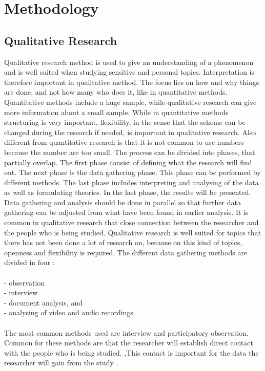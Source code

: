 \chapter{Methodology}
\section{Qualitative Research}
Qualitative research method is used to give an understanding of a phenomenon and is well suited when studying sensitive and personal topics. Interpretation is therefore important in qualitative method.  The focus lies on how and why things are done, and not how many who does it, like in quantitative methods. Quantitative methods include a huge sample, while qualitative research can give more information about a small sample. While in quantitative methods structuring is very important, flexibility, in the sense that the scheme can be changed during the research if needed, is important in qualitative research. Also different from quantitative research is that it is not common to use numbers because the number are too small. The process can be divided into phases, that partially overlap. The first phase consist of defining what the research will find out. The next phase is the data gathering phase. This phase can be performed by different methods. The last phase includes interpreting and analysing of the data as well as formulating theories. In the last phase, the results will be presented. Data gathering and analysis should be done in parallel so that further data gathering can be adjusted from what have been found in earlier analysis. It is common in qualitative research that close connection between the researcher and the people who is being studied. Qualitative research is well suited for topics that there has not been done a lot of research on, because on this kind of topics, openness and flexibility is required. The different data gathering methods are divided in four \cite{qualitative}: \\ \\
- observation \\
- interview \\ 
- document analysis, and \\
- analysing of video and audio recordings \\ \\
The most common methods used are interview and participatory observation. Common for  these methods are that the researcher will establish direct contact with the people who is being studied. ,This contact is important for the data the researcher will gain from the study \cite{qualitative}. \\ \\

